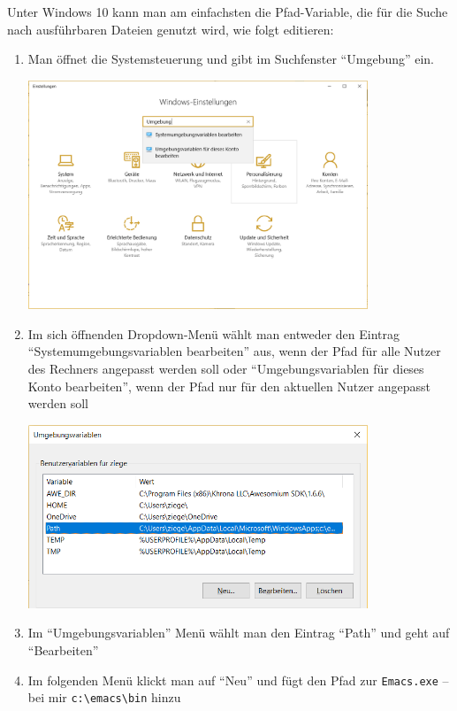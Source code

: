 \documentclass[12pt,ngerman]{scrbook}
\begin{document}
\begin{tcolorbox}[title={Anpassung der PATH-Variablen unter Windows},breakable]
Unter Windows 10 kann man am einfachsten die Pfad-Variable, die für die Suche nach ausführbaren Dateien genutzt wird, wie folgt editieren: 

\begin{enumerate}
\item Man öffnet die Systemsteuerung und gibt im Suchfenster \enquote{Umgebung} ein.

\begin{center}
\includegraphics[width=0.8\textwidth]{Bilder/path-01}
\end{center}

\item Im sich öffnenden Dropdown-Menü wählt man entweder den Eintrag \enquote{Systemumgebungsvariablen bearbeiten} aus, wenn der Pfad für alle Nutzer des Rechners angepasst werden soll oder \enquote{Umgebungsvariablen für dieses Konto bearbeiten}, wenn der Pfad nur für den aktuellen Nutzer angepasst werden soll

\begin{center}
\includegraphics[width=0.8\textwidth]{Bilder/path-03}
\end{center}


\item Im \enquote{Umgebungsvariablen} Menü wählt man den Eintrag \enquote{Path} und geht auf \enquote{Bearbeiten}
\item Im folgenden Menü klickt man auf \enquote{Neu} und fügt den Pfad zur \texttt{Emacs.exe} -- bei mir \texttt{c:\textbackslash emacs\textbackslash bin} hinzu


\end{enumerate}
\end{tcolorbox}
\end{document}
